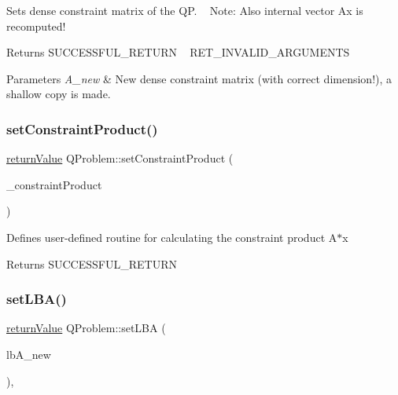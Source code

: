 Sets dense constraint matrix of the QP. ~\newline
Note\+: Also internal vector Ax is recomputed! \begin{DoxyReturn}{Returns}
S\+U\+C\+C\+E\+S\+S\+F\+U\+L\+\_\+\+R\+E\+T\+U\+RN ~\newline
 R\+E\+T\+\_\+\+I\+N\+V\+A\+L\+I\+D\+\_\+\+A\+R\+G\+U\+M\+E\+N\+TS 
\end{DoxyReturn}

\begin{DoxyParams}{Parameters}
{\em A\+\_\+new} & New dense constraint matrix (with correct dimension!), a shallow copy is made. \\
\hline
\end{DoxyParams}
\mbox{\label{class_q_problem_a7405bfa255fa9d05172b2929a3d74825}} 
\subsubsection{\texorpdfstring{set\+Constraint\+Product()}{setConstraintProduct()}}
{\footnotesize\ttfamily \hyperlink{_message_handling_8hpp_a81d556f613bfbabd0b1f9488c0fa865e}{return\+Value} Q\+Problem\+::set\+Constraint\+Product (\begin{DoxyParamCaption}\item[{\hyperlink{class_constraint_product}{Constraint\+Product} $\ast$const}]{\+\_\+constraint\+Product }\end{DoxyParamCaption})}

Defines user-\/defined routine for calculating the constraint product A$\ast$x \begin{DoxyReturn}{Returns}
S\+U\+C\+C\+E\+S\+S\+F\+U\+L\+\_\+\+R\+E\+T\+U\+RN ~\newline
 
\end{DoxyReturn}
\mbox{\label{class_q_problem_a48bae806d7e2703116749a6dba1f3330}} 
\subsubsection{\texorpdfstring{set\+L\+B\+A()}{setLBA()}\hspace{0.1cm}{\footnotesize\ttfamily [1/2]}}
{\footnotesize\ttfamily \hyperlink{_message_handling_8hpp_a81d556f613bfbabd0b1f9488c0fa865e}{return\+Value} Q\+Problem\+::set\+L\+BA (\begin{DoxyParamCaption}\item[{const \hyperlink{qp_o_a_s_e_s__wrapper_8h_a0d00e2b3dfadee81331bbb39068570c4}{real\+\_\+t} $\ast$const}]{lb\+A\+\_\+new }\end{DoxyParamCaption})\hspace{0.3cm}{\ttfamily [inline]}, {\ttfamily [protected]}}

